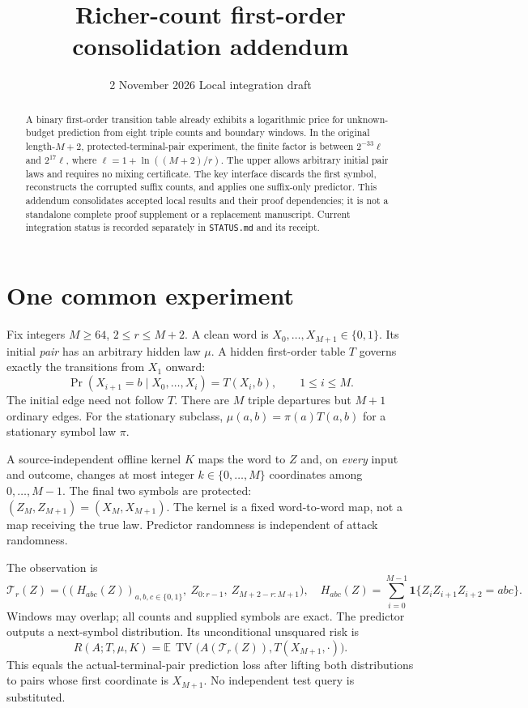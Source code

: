 \documentclass[10pt]{article}
\title{Richer-count first-order consolidation addendum}
\author{}
\date{2 November 2026 \quad Local integration draft}
\newcommand{\TV}{\operatorname{TV}}
\newcommand{\E}{\mathbb E}
\newcommand{\ind}{\mathbf1}
\begin{document}
\maketitle
\vspace{-1.3em}
\begin{abstract}
A binary first-order transition table already exhibits a logarithmic price for unknown-budget prediction from eight triple counts and boundary windows. In the original length-$M+2$, protected-terminal-pair experiment, the finite factor is between $2^{-33}\ell$ and $2^{17}\ell$, where $\ell=1+\ln((M+2)/r)$. The upper allows arbitrary initial pair laws and requires no mixing certificate. The key interface discards the first symbol, reconstructs the corrupted suffix counts, and applies one suffix-only predictor. This addendum consolidates accepted local results and their proof dependencies; it is not a standalone complete proof supplement or a replacement manuscript. Current integration status is recorded separately in \texttt{STATUS.md} and its receipt.
\end{abstract}
\section{One common experiment}
Fix integers $M\ge64$, $2\le r\le M+2$. A clean word is $X_0,\ldots,X_{M+1}\in\{0,1\}$. Its initial \emph{pair} has an arbitrary hidden law $\mu$. A hidden first-order table $T$ governs exactly the transitions from $X_1$ onward:
\[
 \Pr(X_{i+1}=b\mid X_0,\ldots,X_i)=T(X_i,b),\qquad 1\le i\le M.
\]
The initial edge need not follow $T$. There are $M$ triple departures but $M+1$ ordinary edges. For the stationary subclass, $\mu(a,b)=\pi(a)T(a,b)$ for a stationary symbol law $\pi$.

A source-independent offline kernel $K$ maps the word to $Z$ and, on \emph{every} input and outcome, changes at most integer $k\in\{0,\ldots,M\}$ coordinates among $0,\ldots,M-1$. The final two symbols are protected: $(Z_M,Z_{M+1})=(X_M,X_{M+1})$. The kernel is a fixed word-to-word map, not a map receiving the true law. Predictor randomness is independent of attack randomness.

The observation is
\[
 \mathcal T_r(Z)=\big((H_{abc}(Z))_{a,b,c\in\{0,1\}},\ Z_{0:r-1},\ Z_{M+2-r:M+1}\big),
 \quad H_{abc}(Z)=\sum_{i=0}^{M-1}\ind\{Z_iZ_{i+1}Z_{i+2}=abc\}.
\]
Windows may overlap; all counts and supplied symbols are exact. The predictor outputs a next-symbol distribution. Its unconditional unsquared risk is
\[
 R(A;T,\mu,K)=\E\,\TV\big(A(\mathcal T_r(Z)),T(X_{M+1},\cdot)\big).
\]
This equals the actual-terminal-pair prediction loss after lifting both distributions to pairs whose first coordinate is $X_{M+1}$. No independent test query is substituted.
\end{document}
